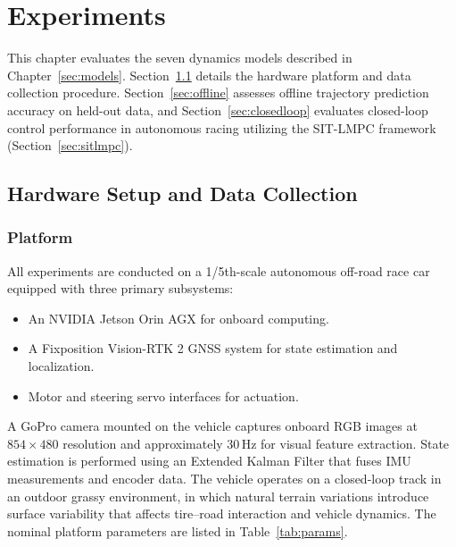 \chapter{Experiments}
\label{sec:experiments}

This chapter evaluates the seven dynamics models described in Chapter~\ref{sec:models}. Section~\ref{sec:hardware} details the hardware platform and data collection procedure. Section~\ref{sec:offline} assesses offline trajectory prediction accuracy on held-out data, and Section~\ref{sec:closedloop} evaluates closed-loop control performance in autonomous racing utilizing the SIT-LMPC framework (Section~\ref{sec:sitlmpc}).

\section{Hardware Setup and Data Collection}
\label{sec:hardware}

\subsection{Platform}
\label{sec:platform}
All experiments are conducted on a 1/5th-scale autonomous off-road race car equipped with three primary subsystems:
\begin{itemize}
    \item An NVIDIA Jetson Orin AGX for onboard computing.
    \item A Fixposition Vision-RTK 2 GNSS system for state estimation and localization.
    \item Motor and steering servo interfaces for actuation.
\end{itemize}
A GoPro camera mounted on the vehicle captures onboard RGB images at $854 \times 480$ resolution and approximately 30\,Hz for visual feature extraction. State estimation is performed using an Extended Kalman Filter that fuses IMU measurements and encoder data. The vehicle operates on a closed-loop track in an outdoor grassy environment, in which natural terrain variations introduce surface variability that affects tire--road interaction and vehicle dynamics. The nominal platform parameters are listed in Table~\ref{tab:params}.

